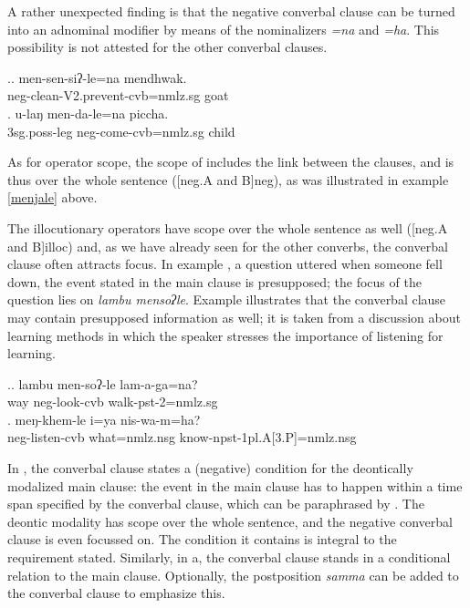 	
A rather unexpected finding is that the negative converbal clause can be turned into an adnominal modifier by means of the nominalizers \emph{=na} and \emph{=ha}. This possibility is not attested for the other converbal clauses.

\ex.\ag. men-sen-siʔ-le=na    mendhwak.\\
{\sc neg-}clean{\sc -V2.prevent-cvb=nmlz.sg} goat\\
 
 \bg. u-laŋ men-da-le=na piccha.\\ 
	{\sc 3sg.poss}-leg {\sc neg-}come-{\sc cvb=nmlz.sg} child\\ 
	
\newpage
As for operator scope, the scope of  includes the link between the clauses, and is thus over the whole sentence  ([neg.A and B]{\sc neg}), as was illustrated in example \ref{menjale} above. 


The illocutionary operators have scope over the whole sentence as well ([neg.A and B]{\sc illoc}) and, as we have already seen for the other converbs, the converbal clause often attracts focus. In example \Next[a], a question uttered when someone fell down, the event stated in the main clause is presupposed; the focus of the question lies on \emph{lambu mensoʔle}. Example \Next[b] illustrates that the converbal clause may contain presupposed information as well; it is taken from a discussion about learning methods in which the speaker stresses the importance of listening for learning.

	\ex.\ag. lambu men-soʔ-le lam-a-ga=na?\\
		way   {\sc neg-}look{\sc -cvb} walk{\sc -pst-2=nmlz.sg}\\
	\bg.	meŋ-khem-le i=ya nis-wa-m=ha?\\
			{\sc neg}-listen-{\sc cvb} what{\sc =nmlz.nsg} know{\sc -npst-1pl.A[3.P]=nmlz.nsg}\\
	

In \Next[a], the converbal clause states a (negative) condition for the deontically modalized main clause: the event in the main clause has to happen within a time span specified by the converbal clause, which can be paraphrased by . The deontic modality has scope over the whole sentence, and the negative converbal clause is even focussed on. The condition it contains is integral to the requirement stated. Similarly, in \Next[b] a, the  converbal clause stands in a conditional relation to the main clause. Optionally, the  postposition \emph{samma}  can be added to the converbal clause to emphasize this. 
\largerpage 

